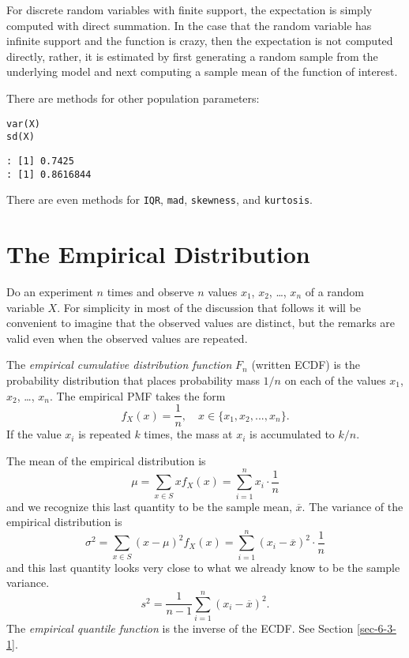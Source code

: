 For discrete random variables with finite support, the expectation is
simply computed with direct summation. In the case that the random
variable has infinite support and the function is crazy, then the
expectation is not computed directly, rather, it is estimated by first
generating a random sample from the underlying model and next
computing a sample mean of the function of interest.

There are methods for other population parameters:

\begin{verbatim}
var(X)
sd(X)
\end{verbatim}

\begin{verbatim}
: [1] 0.7425
: [1] 0.8616844
\end{verbatim}

There are even methods for \texttt{IQR}, \texttt{mad}, \texttt{skewness}, and \texttt{kurtosis}.

\section{The Empirical Distribution}
\label{sec-5-5}

Do an experiment \(n\) times and observe \(n\) values \(x_{1}\),
\(x_{2}\), \ldots{}, \(x_{n}\) of a random variable \(X\). For simplicity
in most of the discussion that follows it will be convenient to
imagine that the observed values are distinct, but the remarks are
valid even when the observed values are repeated.

\begin{defn}
The \emph{empirical cumulative distribution function} \(F_{n}\) (written
ECDF)  is the probability distribution
that places probability mass \(1/n\) on each of the values \(x_{1}\),
\(x_{2}\), \ldots{}, \(x_{n}\). The empirical PMF takes the form
\begin{equation} 
f_{X}(x)=\frac{1}{n},\quad x\in \{ x_{1},x_{2},...,x_{n} \}.
\end{equation}
If the value \(x_{i}\) is repeated \(k\) times, the mass at \(x_{i}\) is accumulated to \(k/n\).
\end{defn}

The mean of the empirical distribution is
\begin{equation}
\mu=\sum_{x\in S}xf_{X}(x)=\sum_{i=1}^{n}x_{i}\cdot\frac{1}{n}
\end{equation}
and we recognize this last quantity to be the sample mean, \(\overline{x}\). The variance of the empirical distribution is
\begin{equation}
\sigma^{2}=\sum_{x\in S}(x-\mu)^{2}f_{X}(x)=\sum_{i=1}^{n}(x_{i}-\overline{x})^{2}\cdot\frac{1}{n}
\end{equation}
and this last quantity looks very close to what we already know to be the sample variance.
\begin{equation}
s^{2}=\frac{1}{n-1}\sum_{i=1}^{n}(x_{i}-\overline{x})^{2}.
\end{equation}
The \emph{empirical quantile function} is the inverse of the ECDF. See
Section \ref{sec-6-3-1}.

